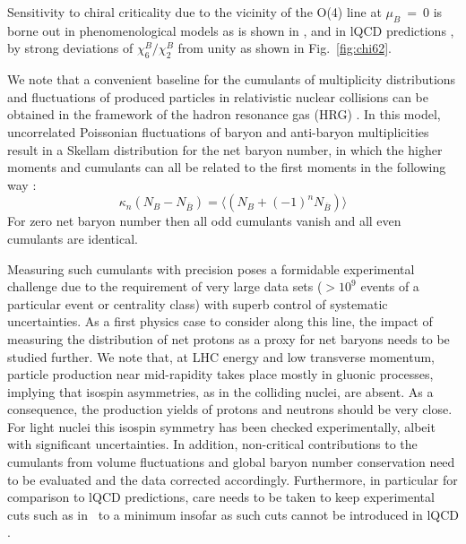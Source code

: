 Sensitivity to chiral criticality due to the vicinity of the O(4) line at $\mu_B~=~0$ is borne out in phenomenological models as is shown in \cite{Friman:2011pf,Almasi:2017bhq}, and in lQCD predictions \cite{Bazavov:2017dus,Borsanyi:2018grb}, by strong deviations of $\chi_6^B/\chi_2^B$ from unity as shown in Fig.~\ref{fig:chi62}.

We note that a convenient baseline for the cumulants of multiplicity distributions and fluctuations of produced particles in relativistic nuclear collisions can be obtained in the framework of the hadron re\-so\-nance gas (HRG) \cite{Allton:2005gk,Karsch:2010ck,BraunMunzinger:2011ta,Borsanyi:2018grb,Luo:2017faz}. In this model, uncorrelated Poissonian fluctuations of baryon and anti-baryon multiplicities result in a Skellam distribution for the net baryon number, in which the higher moments and cumulants can all be related to the first moments in the following way \cite{BraunMunzinger:2011ta,BraunMunzinger:2011dn, Braun-Munzinger:2018yru}:
\begin{equation}
\label{lbaseline}
\kappa_n(N_B - N_{\overline{B}}) = \langle (N_B +(-1)^n N_{\overline{B}}) \rangle
\end{equation}
For zero net baryon number then all odd cumulants vanish and all even cumulants are identical.

Measuring such cumulants with precision poses a formidable experimental challenge due to the requirement of very large data sets ($> 10^9$ events of a particular event or centrality class) with superb control of systematic uncertainties. As a first physics case to consider along this line, the impact of measuring the distribution of net protons as a proxy for net baryons needs to be studied further. We note that, at LHC energy and low transverse momentum, particle production near mid-rapidity takes place mostly in gluonic processes, implying that isospin asymmetries, as in the colliding nuclei, are absent. As a consequence, the production yields of protons and neutrons should be very close. For light nuclei this isospin symmetry has been checked experimentally, albeit with significant uncertainties. 
In addition, non-critical contributions to the cumulants from volume fluctuations and global baryon number conservation \cite{Skokov:2012ds,Braun-Munzinger:2016yjz, Braun-Munzinger:2018yru} need to be evaluated and the data corrected accordingly. Furthermore, in particular for comparison to lQCD predictions, care needs to be taken to keep experimental cuts such as in \pT\ to a minimum insofar as such cuts cannot be introduced in lQCD \cite{Karsch:2015zna,Alba:2015iva}.
     
